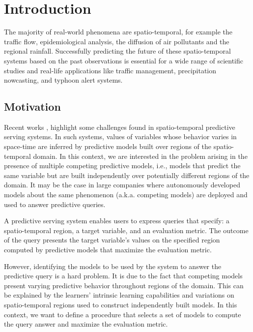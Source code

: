 \chapter[Introduction]{Introduction}\label{chap_intro}

The majority of real-world phenomena are spatio-temporal, for example the traffic flow, epidemiological analysis, the diffusion of air pollutants and the regional rainfall. Successfully predicting the future of these spatio-temporal systems based on the past observations is essential for a wide range of scientific studies and real-life applications like traffic management, precipitation nowcasting, and typhoon alert systems.


\section{Motivation}
\label{Sec:Motivation}

Recent works \cite{Ghanta022019, Crankshaw2017, Polyzotis2018}, highlight some challenges found in spatio-temporal predictive serving systems. In such systems, values of variables whose behavior varies in space-time are inferred by predictive models built over regions of the spatio-temporal domain. In this context, we are interested in the problem arising in the presence of multiple competing predictive models, i.e., models that predict the same variable but are built independently over potentially different regions of the domain. It may be the case in large companies where autonomously developed models about the same phenomenon (a.k.a. competing models) are deployed and used to answer predictive queries. 

A predictive serving system enables users to express queries that specify: a spatio-temporal region, a target variable, and an evaluation metric. The outcome of the query presents the target variable's values on the specified region computed by predictive models that maximize the evaluation metric. 

However, identifying the  models to be used by the system to answer the predictive query is a hard problem. It is due to the fact that competing models present varying predictive behavior throughout regions of the domain. This can be explained by the learners' intrinsic learning capabilities and variations on spatio-temporal regions used to construct independently built models. In this context, we want to define a procedure that selects a set of models to compute the query answer and maximize the evaluation metric. 

